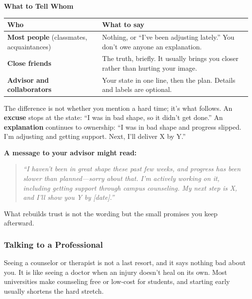 \documentclass[11pt,a4paper]{article}
\begin{document}
\textbf{What to Tell Whom}

\begin{table}[H]
\centering
\small
\begin{tabular}{@{}p{3.8cm}p{8.8cm}@{}}
\toprule
\textbf{Who} & \textbf{What to say} \\
\midrule
\textbf{Most people} (classmates, acquaintances) & Nothing, or ``I've been adjusting lately.'' You don't owe anyone an explanation. \\
\textbf{Close friends} & The truth, briefly. It usually brings you closer rather than hurting your image. \\
\textbf{Advisor and collaborators} & Your state in one line, then the plan. Details and labels are optional. \\
\bottomrule
\end{tabular}
\end{table}

\begin{tcolorbox}[colback=green!5,colframe=green!50,title={Explanation vs.\ Excuse}]
The difference is not whether you mention a hard time; it's what follows. An \textbf{excuse} stops at the state: ``I was in bad shape, so it didn't get done.'' An \textbf{explanation} continues to ownership: ``I was in bad shape and progress slipped. I'm adjusting and getting support. Next, I'll deliver X by Y.''

\vspace{0.3em}
\textbf{A message to your advisor might read:}
\begin{quote}
\textit{``I haven't been in great shape these past few weeks, and progress has been slower than planned---sorry about that. I'm actively working on it, including getting support through campus counseling. My next step is X, and I'll show you Y by [date].''}
\end{quote}
What rebuilds trust is not the wording but the small promises you keep afterward.
\end{tcolorbox}

\subsubsection{Talking to a Professional}

Seeing a counselor or therapist is not a last resort, and it says nothing bad about you. It is like seeing a doctor when an injury doesn't heal on its own. Most universities make counseling free or low-cost for students, and starting early usually shortens the hard stretch.
\end{document}
